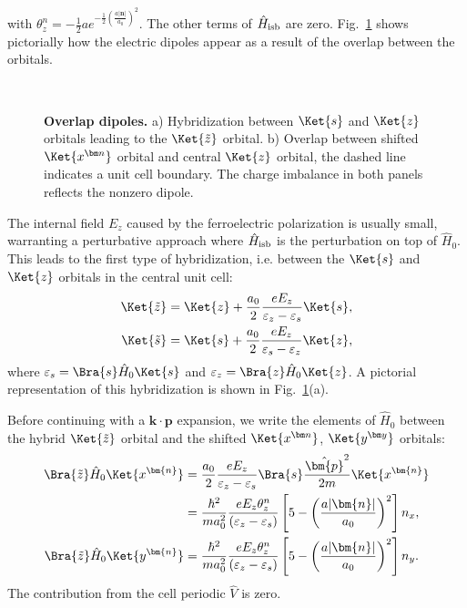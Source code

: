 with $\theta_z^n = -\frac{1}{2}ae^{-\frac{1}{2}\left(\frac{a|\bm{n}|}{a_0}\right)^2}$.
The other terms of $\hat{H}_{\rm isb}$ are zero.
Fig.~\ref{fig:Rashba_overlapdip} shows pictorially how the electric dipoles appear as a result of the overlap between the orbitals. 
\begin{figure}[t]
~\centering
{}\caption{\label{fig:Rashba_overlapdip} {\bf Overlap dipoles.} a) Hybridization between $\Ket{s}$ and $\Ket{z}$ orbitals leading to the $\Ket{\tilde z}$ orbital. b) Overlap between shifted $\Ket{x^{\bm n}}$ orbital and central $\Ket{z}$ orbital, the dashed line indicates a unit cell boundary. The charge imbalance in both panels reflects the nonzero dipole.}
\end{figure}
    
The internal field $E_z$ caused by the ferroelectric polarization is usually small, warranting a perturbative approach where $\hat{H}_{\rm isb}$ is the perturbation on top of $\hat{H}_0$.
This leads to the first type of hybridization, i.e. between the $\Ket{s}$ and $\Ket{z}$ orbitals in the central unit cell:
\begin{align}
	\Ket{\tilde{z}} &= \Ket{z} + \frac{a_0}{2}\frac{e E_z}{\varepsilon_z - \varepsilon_s}\Ket{s},\\
	\Ket{\tilde{s}}   &= \Ket{s} +\frac{a_0}{2}\frac{e E_z}{\varepsilon_s - \varepsilon_z}\Ket{z},
\end{align}
where $\varepsilon_s = \Bra{s} \hat{H}_0 \Ket{s}$ and $\varepsilon_z = \Bra{z} \hat{H}_0 \Ket{z}$. A pictorial representation of this hybridization is shown in Fig.~\ref{fig:Rashba_overlapdip}(a).
    
Before continuing with a $\bm k \cdot \bm p$ expansion, we write the elements of $\hat{H}_0$ between the hybrid $\Ket{\tilde{z}}$ orbital and the shifted $\Ket{x^{\bm n}}$, $\Ket{y^{\bm y}}$ orbitals:
\begin{align}
	\Bra{\tilde{z}} \hat{H}_0 \Ket{x^{\bm{n}}} &=\frac{a_0}{2} \frac{e E_z}{\varepsilon_z - \varepsilon_s}\Bra{s} \frac{\hat{\bm{p}}^2}{2m} \Ket{x^{\bm{n}}}\label{eq:Rashba_momentum_dip}\\
	&= \frac{\hbar^2}{m a_0^2}\frac{e E_z \theta_z^n}{(\varepsilon_z - \varepsilon_s)} \left[5 - \left(\frac{a |\bm{n}|}{a_0}\right)^2\right]n_x,\label{eq:Rashba_momentum_dip1}\\
	\Bra{\tilde{z}} \hat{H}_0 \Ket{y^{\bm{n}}} &=\frac{\hbar^2}{m a_0^2} \frac{e E_z\theta_z^n}{(\varepsilon_z - \varepsilon_s)}\left[5 - \left(\frac{a |\bm{n}|}{a_0}\right)^2\right]n_y\label{eq:Rashba_momentum_dip2}.
\end{align}
The contribution from the cell periodic $\hat{V}$ is zero.
    
